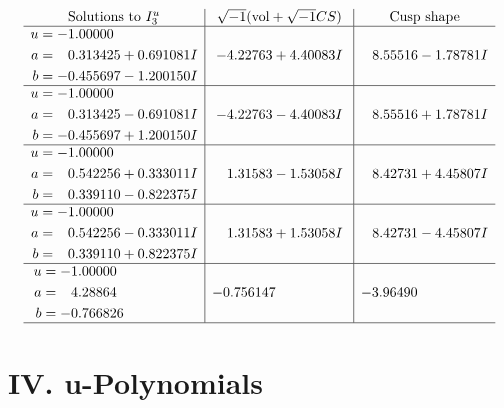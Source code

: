 \documentclass[1p]{elsarticle_modified}
\theoremstyle{definition}
\newcommand{\I}{\sqrt{-1}}
\begin{document}
$$\begin{array}{c|c|c}  
\text{Solutions to }I^u_{3}& \I (\text{vol} + \sqrt{-1}CS) & \text{Cusp shape}\\
 \hline 
\begin{aligned}
u &= -1.00000\phantom{ +0.000000I} \\
a &= \phantom{-}0.313425 + 0.691081 I \\
b &= -0.455697 - 1.200150 I\end{aligned}
 & -4.22763 + 4.40083 I & \phantom{-}8.55516 - 1.78781 I \\ \hline\begin{aligned}
u &= -1.00000\phantom{ +0.000000I} \\
a &= \phantom{-}0.313425 - 0.691081 I \\
b &= -0.455697 + 1.200150 I\end{aligned}
 & -4.22763 - 4.40083 I & \phantom{-}8.55516 + 1.78781 I \\ \hline\begin{aligned}
u &= -1.00000\phantom{ +0.000000I} \\
a &= \phantom{-}0.542256 + 0.333011 I \\
b &= \phantom{-}0.339110 - 0.822375 I\end{aligned}
 & \phantom{-}1.31583 - 1.53058 I & \phantom{-}8.42731 + 4.45807 I \\ \hline\begin{aligned}
u &= -1.00000\phantom{ +0.000000I} \\
a &= \phantom{-}0.542256 - 0.333011 I \\
b &= \phantom{-}0.339110 + 0.822375 I\end{aligned}
 & \phantom{-}1.31583 + 1.53058 I & \phantom{-}8.42731 - 4.45807 I \\ \hline\begin{aligned}
u &= -1.00000\phantom{ +0.000000I} \\
a &= \phantom{-}4.28864\phantom{ +0.000000I} \\
b &= -0.766826\phantom{ +0.000000I}\end{aligned}
 & -0.756147\phantom{ +0.000000I} & -3.96490\phantom{ +0.000000I}\\
 \hline 
 \end{array}$$\newpage
\newpage\renewcommand{\arraystretch}{1}
\centering \section*{ IV. u-Polynomials}
\end{document}
